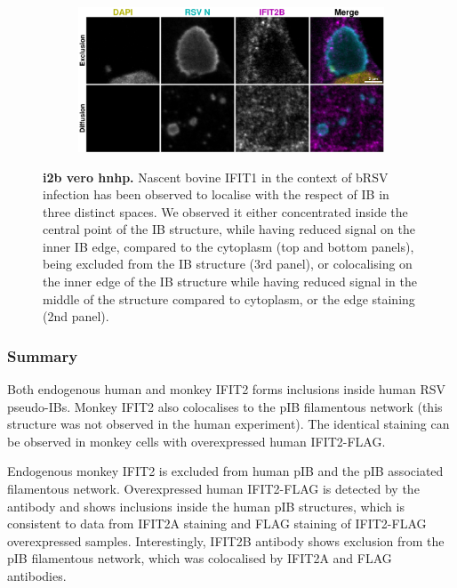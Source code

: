 \begin{figure}
\begin{subfigure}{0.5\textwidth}
    \end{subfigure}
    \begin{subfigure}{1\textwidth}
        \caption{}
        \includegraphics[width=1\linewidth]{10. Chapter 5/Figs/02. pIB/03. IFIT2B/06. i2b-vero-hnhp.pdf} 
    \end{subfigure}
    \caption[i2b vero hnhp]{\textbf{i2b vero hnhp.} Nascent bovine IFIT1 in the context of bRSV infection has been observed to localise with the respect of IB in three distinct spaces. We observed it either concentrated inside the central point of the IB structure, while having reduced signal on the inner IB edge, compared to the cytoplasm (top and bottom panels), being excluded from the IB structure (3rd panel), or colocalising on the inner edge of the IB structure while having reduced signal in the middle of the structure compared to cytoplasm, or the edge staining (2nd panel).}
    \label{fig:i2b vero hnhp}
\end{figure}

\subsubsection{Summary} \label{Summary-i2-pib}
Both endogenous human and monkey IFIT2 forms inclusions inside human RSV pseudo-IBs. Monkey IFIT2 also colocalises to the pIB filamentous network (this structure was not observed in the human experiment). The identical staining can be observed in monkey cells with overexpressed human IFIT2-FLAG.

Endogenous monkey IFIT2 is excluded from human pIB and the pIB associated filamentous network. Overexpressed human IFIT2-FLAG is detected by the antibody and shows inclusions inside the human pIB structures, which is consistent to data from IFIT2A staining and FLAG staining of IFIT2-FLAG overexpressed samples. Interestingly, IFIT2B antibody shows exclusion from the pIB filamentous network, which was colocalised by IFIT2A and FLAG antibodies.